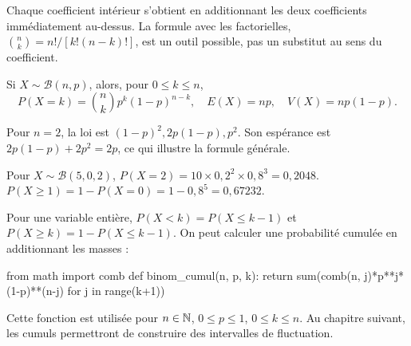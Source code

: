 Chaque coefficient intérieur s'obtient en additionnant les deux coefficients immédiatement au-dessus. La formule avec les factorielles, $\binom nk=n!/[k!(n-k)!]$, est un outil possible, pas un substitut au sens du coefficient.
\begin{propriete}
Si $X\sim\mathcal B(n,p)$, alors, pour $0\leq k\leq n$,
\[P(X=k)=\binom nkp^k(1-p)^{n-k},\quad E(X)=np,\quad V(X)=np(1-p).\]
\end{propriete}
Pour $n=2$, la loi est $(1-p)^2,2p(1-p),p^2$. Son espérance est $2p(1-p)+2p^2=2p$, ce qui illustre la formule générale.
\begin{exemple}
Pour $X\sim\mathcal B(5,0{,}2)$,
$P(X=2)=10\times0{,}2^2\times0{,}8^3=0{,}2048$.
$P(X\geq1)=1-P(X=0)=1-0{,}8^5=0{,}67232$.
\end{exemple}
Pour une variable entière, $P(X<k)=P(X\leq k-1)$ et $P(X\geq k)=1-P(X\leq k-1)$.
On peut calculer une probabilité cumulée en additionnant les masses :
\begin{python}
from math import comb
def binom_cumul(n, p, k):
    return sum(comb(n, j)*p**j*(1-p)**(n-j)
               for j in range(k+1))
\end{python}
Cette fonction est utilisée pour $n\in\mathbb{N}$, $0\leq p\leq1$, $0\leq k\leq n$. Au chapitre suivant, les cumuls permettront de construire des intervalles de fluctuation.

